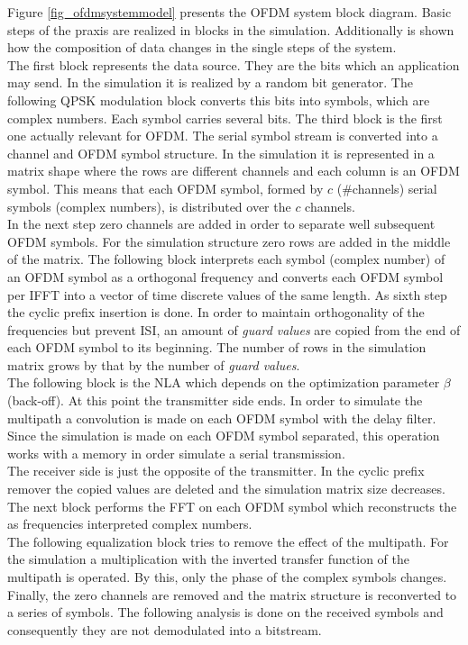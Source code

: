 Figure \ref{fig_ofdmsystemmodel} presents the OFDM system block diagram.
Basic steps of the praxis are realized in blocks in the simulation. Additionally is shown how the composition of data changes in the single steps of the system.\\
The first block represents the data source. They are the bits which an application may send. In the simulation it is realized by a random bit generator. The following QPSK modulation block converts this bits into symbols, which are complex numbers. Each symbol carries several bits. The third block is the first one actually relevant for OFDM. The serial symbol stream is converted into a channel and OFDM symbol structure. In the simulation it is represented in a matrix shape where the rows are different channels and each column is an OFDM symbol. This means that each OFDM symbol, formed by $c$ (\#channels) serial symbols (complex numbers), is distributed over the $c$ channels.\\
In the next step zero channels are added in order to separate well subsequent OFDM symbols. For the simulation structure zero rows are added in the middle of the matrix. The following block interprets each symbol (complex number) of an OFDM symbol as a orthogonal frequency and converts each OFDM symbol per IFFT into a vector of time discrete values of the same length. As sixth step the cyclic prefix insertion is done. In order to maintain orthogonality of the frequencies but prevent ISI, an amount of \textit{guard values} are copied from the end of each OFDM symbol to its beginning. The number of rows in the simulation matrix grows by that by the number of \textit{guard values}.\\
The following block is the NLA which depends on the optimization parameter $\beta$ (back-off). At this point the transmitter side ends. In order to simulate the multipath a convolution is made on each OFDM symbol with the delay filter. Since the simulation is made on each OFDM symbol separated, this operation works with a memory in order simulate a serial transmission.\\
The receiver side is just the opposite of the transmitter. In the cyclic prefix remover the copied values are deleted and the simulation matrix size decreases. The next block performs the FFT on each OFDM symbol which reconstructs the as frequencies interpreted complex numbers.\\ The following equalization block tries to remove the effect of the multipath. For the simulation a multiplication with the inverted transfer function of the multipath is operated. By this, only the phase of the complex symbols changes.\\ Finally, the zero channels are removed and the matrix structure is reconverted to a series of symbols. The following analysis is done on the received symbols and consequently they are not demodulated into a bitstream.